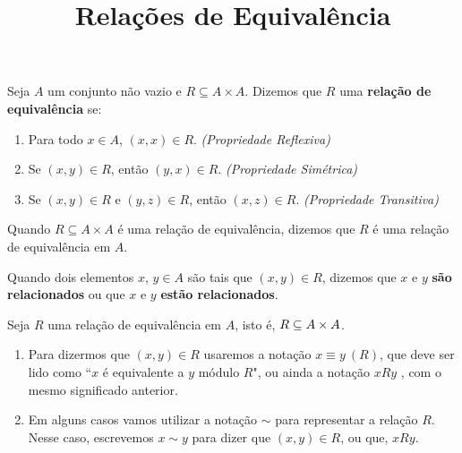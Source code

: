\documentclass{beamer}
\title{Relações de Equivalência}
\author[\autor]{\autor}
\institute[\instituto]{\instituto}
\date{}
\begin{document}
    \begin{frame}
        \maketitle
    \end{frame}


    \begin{frame}
        \begin{definicao}
            Seja $A$ um conjunto n{\~a}o vazio \pause e $R\subseteq A \times A$. \pause Dizemos que $R$  uma \textbf{rela{\c c}{\~a}o de equival{\^e}ncia} se:\pause
            \begin{enumerate}[label={\roman*})]
                \item Para todo $x \in A$, \pause $(x,x) \in R$. \pause \textit{(Propriedade Reflexiva)}\pause
                \item Se $(x, y) \in R$, \pause ent\~ao $(y, x) \in R$. \pause \textit{(Propriedade Sim\'etrica)}\pause
                \item Se $(x, y) \in R$ \pause e $(y, z) \in R$, \pause ent\~ao $(x, z)\in R$. \pause \textit{(Propriedade Transitiva)}\pause
            \end{enumerate}
        \end{definicao}

        Quando $R\subseteq A \times A$ {\'e} uma rela{\c c}{\~a}o de equival{\^e}ncia, \pause dizemos que $R$ {\'e} uma rela{\c c}{\~a}o de equival{\^e}ncia em $A$. \pause

        Quando dois elementos $x$, $y \in A$ \pause s{\~a}o tais que $(x,y) \in R$, \pause dizemos que $x$ e $y$ \textbf{s{\~a}o relacionados} \pause ou que $x$ e $y$ \textbf{est\~ao relacionados}.
    \end{frame}

    \begin{frame}
        \begin{observacoes}
            Seja $R$ uma rela{\c c}{\~a}o de equival{\^e}ncia em $A$, \pause isto \'e, $R \subseteq A \times A$.\pause
            \begin{enumerate}[label={\arabic*})]
                \item  Para dizermos que $(x, y) \in R$ \pause usaremos a nota{\c c}{\~a}o $x\equiv y\ (R)$, \pause que deve ser lido como ``$x$ \'e equivalente a $y$ m{\'o}dulo $R$", \pause ou ainda a nota{\c c}{\~a}o $xRy$ \pause, com o mesmo significado anterior.\pause\vspace{.2cm}

                \item Em alguns casos vamos utilizar a nota\c{c}\~ao $\sim$ \pause para representar a rela\c{c}\~ao $R$. \pause Nesse caso, escrevemos $x \sim y$ \pause para dizer que $(x, y) \in R$, \pause ou que, $xRy$.
            \end{enumerate}
        \end{observacoes}
    \end{frame}
\end{document}
